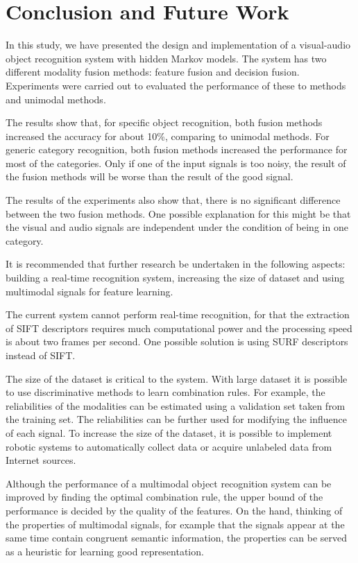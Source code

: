 \documentclass[12pt,final,twoside]{report}
\begin{document}
\cleardoublepage
\chapter{Conclusion and Future Work}
\label{ch:conclusion}
In this study, we have presented the design and implementation of a visual-audio object recognition system with hidden Markov models. The system has two different modality fusion methods: feature fusion and decision fusion. Experiments were carried out to evaluated the performance of these to methods and unimodal methods.

The results show that, for specific object recognition, both fusion methods increased the accuracy for about 10\%, comparing to unimodal methods. For generic category recognition, both fusion methods increased the performance for most of the categories. Only if one of the input signals is too noisy, the result of the fusion methods will be worse than the result of the good signal. 

The results of the experiments also show that, there is no significant difference between the two fusion methods. One possible explanation for this might be that the visual and audio signals are independent under the condition of being in one category.

It is recommended that further research be undertaken in the following aspects: building a real-time recognition system, increasing the size of dataset and using multimodal signals for feature learning.

The current system cannot perform real-time recognition, for that the extraction of SIFT descriptors requires much computational power and the processing speed is about two frames per second. One possible solution is using SURF descriptors instead of SIFT.

The size of the dataset is critical to the system. With large dataset it is possible to use discriminative methods to learn combination rules. For example, the reliabilities of the modalities can be estimated using a validation set taken from the training set. The reliabilities can be further used for modifying the influence of each signal. To increase the size of the dataset, it is possible to implement robotic systems to automatically collect data or acquire unlabeled data from Internet sources.

Although the performance of a multimodal object recognition system can be improved by finding the optimal combination rule, the upper bound of the performance is decided by the quality of the features. On the hand, thinking of the properties of multimodal signals, for example that the signals appear at the same time contain congruent semantic information, the properties can be served as a heuristic for learning good representation.
\end{document}
